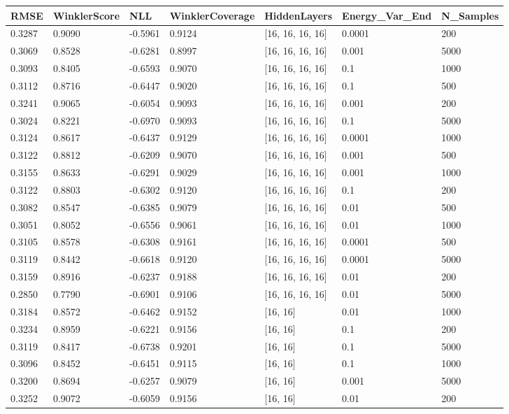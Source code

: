\begin{tabular}{lllllll}
\toprule
RMSE & WinklerScore & NLL & WinklerCoverage & HiddenLayers & Energy_Var_End & N_Samples \\
\midrule
0.3287 & 0.9090 & -0.5961 & 0.9124 & [16, 16, 16, 16] & 0.0001 & 200 \\
0.3069 & 0.8528 & -0.6281 & 0.8997 & [16, 16, 16, 16] & 0.001 & 5000 \\
0.3093 & 0.8405 & -0.6593 & 0.9070 & [16, 16, 16, 16] & 0.1 & 1000 \\
0.3112 & 0.8716 & -0.6447 & 0.9020 & [16, 16, 16, 16] & 0.1 & 500 \\
0.3241 & 0.9065 & -0.6054 & 0.9093 & [16, 16, 16, 16] & 0.001 & 200 \\
0.3024 & 0.8221 & -0.6970 & 0.9093 & [16, 16, 16, 16] & 0.1 & 5000 \\
0.3124 & 0.8617 & -0.6437 & 0.9129 & [16, 16, 16, 16] & 0.0001 & 1000 \\
0.3122 & 0.8812 & -0.6209 & 0.9070 & [16, 16, 16, 16] & 0.001 & 500 \\
0.3155 & 0.8633 & -0.6291 & 0.9029 & [16, 16, 16, 16] & 0.001 & 1000 \\
0.3122 & 0.8803 & -0.6302 & 0.9120 & [16, 16, 16, 16] & 0.1 & 200 \\
0.3082 & 0.8547 & -0.6385 & 0.9079 & [16, 16, 16, 16] & 0.01 & 500 \\
0.3051 & 0.8052 & -0.6556 & 0.9061 & [16, 16, 16, 16] & 0.01 & 1000 \\
0.3105 & 0.8578 & -0.6308 & 0.9161 & [16, 16, 16, 16] & 0.0001 & 500 \\
0.3119 & 0.8442 & -0.6618 & 0.9120 & [16, 16, 16, 16] & 0.0001 & 5000 \\
0.3159 & 0.8916 & -0.6237 & 0.9188 & [16, 16, 16, 16] & 0.01 & 200 \\
0.2850 & 0.7790 & -0.6901 & 0.9106 & [16, 16, 16, 16] & 0.01 & 5000 \\
0.3184 & 0.8572 & -0.6462 & 0.9152 & [16, 16] & 0.01 & 1000 \\
0.3234 & 0.8959 & -0.6221 & 0.9156 & [16, 16] & 0.1 & 200 \\
0.3119 & 0.8417 & -0.6738 & 0.9201 & [16, 16] & 0.1 & 5000 \\
0.3096 & 0.8452 & -0.6451 & 0.9115 & [16, 16] & 0.1 & 1000 \\
0.3200 & 0.8694 & -0.6257 & 0.9079 & [16, 16] & 0.001 & 5000 \\
0.3252 & 0.9072 & -0.6059 & 0.9156 & [16, 16] & 0.01 & 200 \\

\end{tabular}
